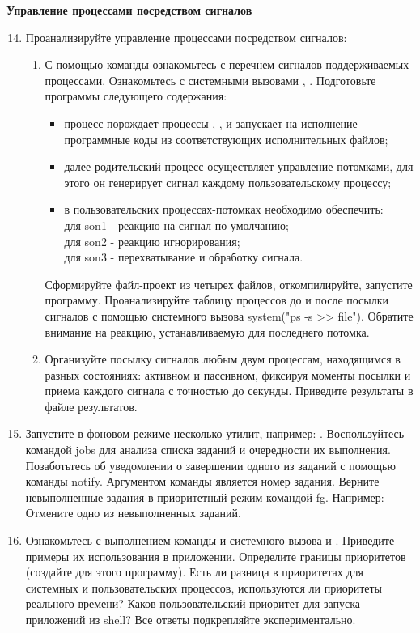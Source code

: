 \textbf{Управление процессами посредством сигналов}

\begin{enumerate}
	\setcounter{enumi}{13}
	\item Проанализируйте управление процессами посредством сигналов:
		\begin{enumerate}
			\item С помощью команды  ознакомьтесь с перечнем сигналов поддерживаемых процессами. Ознакомьтесь с системными вызовами , . Подготовьте программы следующего содержания:
				\begin{itemize}
					\item процесс  порождает процессы , ,  и запускает на исполнение программные коды из соответствующих исполнительных файлов;
					\item далее родительский процесс осуществляет управление потомками, для этого он генерирует сигнал каждому пользовательскому процессу;
					\item в пользовательских процессах-потомках необходимо обеспечить: \\для son1 - реакцию на сигнал по умолчанию; \\для son2 - реакцию игнорирования; \\для son3 - перехватывание и обработку сигнала.
				\end{itemize}
			Сформируйте файл-проект из четырех файлов, откомпилируйте, запустите программу. Проанализируйте таблицу процессов до и после посылки сигналов с помощью системного вызова system("ps -s >> file"). Обратите внимание на реакцию, устанавливаемую для последнего
			потомка.
			\item Организуйте посылку сигналов любым двум процессам, находящимся в разных состояниях: активном и пассивном, фиксируя моменты посылки и приема каждого сигнала с точностью до секунды. Приведите результаты в файле результатов.
		\end{enumerate}
	\item Запустите в фоновом режиме несколько утилит, например: . Воспользуйтесь командой jobs для анализа списка заданий и очередности их выполнения. Позаботьтесь об уведомлении о завершении одного из заданий с помощью команды notify. Аргументом команды является номер задания. Верните невыполненные задания в приоритетный режим командой fg. Например:  Отмените одно из невыполненных заданий.
	\item Ознакомьтесь с выполнением команды и системного вызова  и . Приведите примеры их использования в приложении. Определите границы приоритетов (создайте для этого программу). Есть ли разница в приоритетах для системных и пользовательских процессов, используются ли приоритеты реального времени? Каков пользовательский приоритет для запуска приложений из shell? Все ответы подкрепляйте экспериментально.

\end{enumerate}
